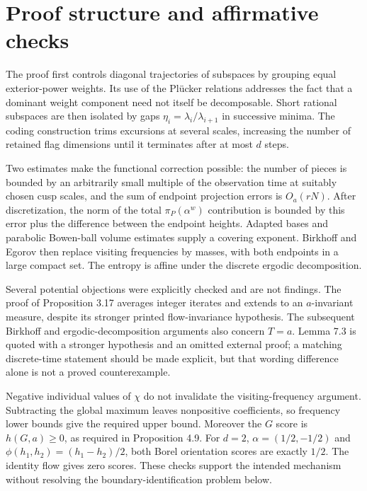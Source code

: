 \documentclass[10pt]{article}
\begin{document}
\section*{Proof structure and affirmative checks}
The proof first controls diagonal trajectories of subspaces by grouping equal exterior-power weights. Its use of the Plücker relations addresses the fact that a dominant weight component need not itself be decomposable. Short rational subspaces are then isolated by gaps \(\eta_i=\lambda_i/\lambda_{i+1}\) in successive minima. The coding construction trims excursions at several scales, increasing the number of retained flag dimensions until it terminates after at most \(d\) steps.\par
Two estimates make the functional correction possible: the number of pieces is bounded by an arbitrarily small multiple of the observation time at suitably chosen cusp scales, and the sum of endpoint projection errors is \(O_a(rN)\). After discretization, the norm of the total \(\pi_P(\alpha^w)\) contribution is bounded by this error plus the difference between the endpoint heights. Adapted bases and parabolic Bowen-ball volume estimates supply a covering exponent. Birkhoff and Egorov then replace visiting frequencies by masses, with both endpoints in a large compact set. The entropy is affine under the discrete ergodic decomposition.\par
Several potential objections were explicitly checked and are not findings. The proof of Proposition 3.17 averages integer iterates and extends to an \(a\)-invariant measure, despite its stronger printed flow-invariance hypothesis. The subsequent Birkhoff and ergodic-decomposition arguments also concern \(T=a\). Lemma 7.3 is quoted with a stronger hypothesis and an omitted external proof; a matching discrete-time statement should be made explicit, but that wording difference alone is not a proved counterexample.\par
Negative individual values of \(\chi\) do not invalidate the visiting-frequency argument. Subtracting the global maximum leaves nonpositive coefficients, so frequency lower bounds give the required upper bound. Moreover the \(G\) score is \(h(G,a)\ge0\), as required in Proposition 4.9. For \(d=2\), \(\alpha=(1/2,-1/2)\) and \(\phi(h_1,h_2)=(h_1-h_2)/2\), both Borel orientation scores are exactly \(1/2\). The identity flow gives zero scores. These checks support the intended mechanism without resolving the boundary-identification problem below.\par
\end{document}
